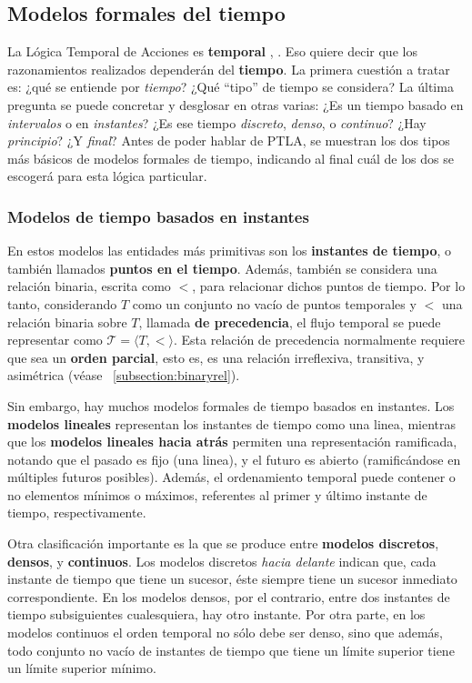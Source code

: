 \subsection{Modelos formales del tiempo}\label{subsection:TLAtime}
La Lógica Temporal de Acciones es \textbf{temporal} \cite{Pnueli1977TheTL}, \cite{gorankoRumberg2020temporal}. Eso quiere decir que los razonamientos realizados dependerán del \textbf{tiempo}. La primera cuestión a tratar es: ¿qué se entiende por \textit{tiempo}? ¿Qué ``tipo'' de tiempo se considera? La última pregunta se puede concretar y desglosar en otras varias: ¿Es un tiempo basado en \textit{intervalos} o en \textit{instantes}? ¿Es ese tiempo \textit{discreto}, \textit{denso}, o \textit{continuo}? ¿Hay \textit{principio}? ¿Y \textit{final}? Antes de poder hablar de PTLA, se muestran los dos tipos más básicos de modelos formales de tiempo, indicando al final cuál de los dos se escogerá para esta lógica particular.

\subsubsection{Modelos de tiempo basados en instantes}\label{subsubsection:TLAtimeinstant}
En estos modelos las entidades más primitivas son los \textbf{instantes de tiempo}, o también llamados \textbf{puntos en el tiempo}. Además, también se considera una relación binaria, escrita como $<$, para relacionar dichos puntos de tiempo. Por lo tanto, considerando $T$ como un conjunto no vacío de puntos temporales y $<$ una relación binaria sobre $T$, llamada \textbf{de precedencia}, el flujo temporal se puede representar como $\mathcal{T} = \langle T, <\rangle$. Esta relación de precedencia normalmente requiere que sea un \textbf{orden parcial}, esto es, es una relación irreflexiva, transitiva, y asimétrica (véase ~\ref{subsection:binaryrel}). 

Sin embargo, hay muchos modelos formales de tiempo basados en instantes. Los \textbf{modelos lineales} representan los instantes de tiempo como una linea, mientras que los \textbf{modelos lineales hacia atrás} permiten una representación ramificada, notando que el pasado es fijo (una linea), y el futuro es abierto (ramificándose en múltiples futuros posibles). Además, el ordenamiento temporal puede contener o no elementos mínimos o máximos, referentes al primer y último instante de tiempo, respectivamente.

Otra clasificación importante es la que se produce entre \textbf{modelos discretos}, \textbf{densos}, y \textbf{continuos}. Los modelos discretos \textit{hacia delante} indican que, cada instante de tiempo que tiene un sucesor, éste siempre tiene un sucesor inmediato correspondiente. En los modelos densos, por el contrario, entre dos instantes de tiempo subsiguientes cualesquiera, hay otro instante. Por otra parte, en los modelos continuos el orden temporal no sólo debe ser denso, sino que además, todo conjunto no vacío de instantes de tiempo que tiene un límite superior tiene un límite superior mínimo.


